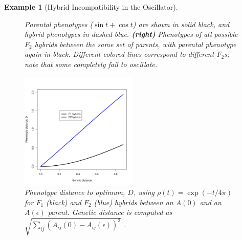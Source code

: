 \documentclass{article}
\newcommand{\plr}[1]{\todo[color=blue!25]{#1}}
\newcommand{\plri}[1]{{\color{blue}\it #1}}
\newcommand{\plr}[1]{{\color{blue}\it #1}}
\newcommand{\plri}[1]{\plr{#1}}
\newcommand{\1}{\mathbbm{1}}
\newtheorem{example}{Example}
\begin{document}
\begin{example}[Hybrid Incompatibility in the Oscillator]
\begin{figure}[H]
{    %
    Parental phenotypes ($\sin t + \cos t$) are shown in solid black, and hybrid phenotypes in dashed blue.
    \textbf{(right)} Phenotypes of all possible $F_2$ hybrids between the same set of parents,
    with parental phenotype again in black.
    Different colored lines correspond to different $F_2$s;
    note that some completely fail to oscillate.
  } \label{fig:hybs}
\end{figure}

  \begin{figure}[H]
  \label{fig:osc_incompat}
    \centering
    \includegraphics[width=0.5\textwidth]{examples/F2_vs_F1_divergence_tau0}
    \caption{Phenotype distance to optimum, $D$, using $\rho(t) = \exp(-t/4\pi)$
    for $F_1$ (black) and $F_2$ (blue) hybrids between an $A(0)$ and an $A(\epsilon)$ parent. Genetic distance is computed as 
    $\sqrt{\sum_{ij} (A_{ij}(0) - A_{ij}(\epsilon))^2}$
    .}
    \label{fig:osc_incompat}
  \end{figure}
\end{example}
\end{document}
